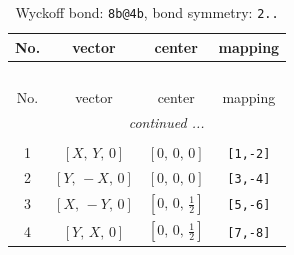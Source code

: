 \documentclass[fleqn,8pt]{jsarticle}
\begin{document}
\renewcommand{\arraystretch}{1.2}
\begin{longtable}{cccc}
\caption{Wyckoff bond: {\tt 8b@4b}, bond symmetry: {\tt 2..}}
 \\
 \hline \hline
No. & vector & center & mapping \\ \hline \endfirsthead

\multicolumn{3}{l}{\tablename\ \thetable{}} \\
 \hline \hline
No. & vector & center & mapping \\ \hline \endhead

 \hline \hline
\multicolumn{3}{r}{\footnotesize\it continued ...} \\ \endfoot

 \hline \hline
\multicolumn{3}{r}{} \\ \endlastfoot

1 & $\left[ X,\, Y,\, 0 \right]$ & $\left[ 0,\, 0,\, 0 \right]$ & {\tt [1,-2]} \\ \hline
2 & $\left[ Y,\, - X,\, 0 \right]$ & $\left[ 0,\, 0,\, 0 \right]$ & {\tt [3,-4]} \\ \hline
3 & $\left[ X,\, - Y,\, 0 \right]$ & $\left[ 0,\, 0,\, \frac{1}{2} \right]$ & {\tt [5,-6]} \\ \hline
4 & $\left[ Y,\, X,\, 0 \right]$ & $\left[ 0,\, 0,\, \frac{1}{2} \right]$ & {\tt [7,-8]} \\
\end{longtable}
\renewcommand{\arraystretch}{1.2}
\end{document}

